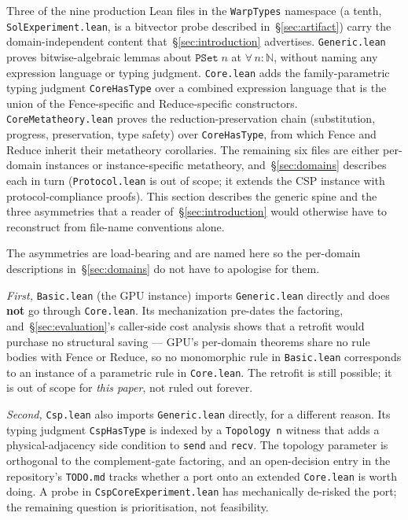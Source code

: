 \documentclass[acmsmall,screen,review,anonymous,nonacm]{acmart}
\newcommand{\PSet}{\texttt{PSet}}
\newcommand{\CoreHasType}{\texttt{CoreHasType}}
\begin{document}
Three of the nine production Lean files in the \texttt{WarpTypes} namespace (a tenth, \texttt{SolExperiment.lean}, is a bitvector probe described in~\S\ref{sec:artifact}) carry the domain-independent content that~\S\ref{sec:introduction} advertises. \texttt{Generic.lean} proves bitwise-algebraic lemmas about $\PSet\;n$ at $\forall\,n : \mathbb{N}$, without naming any expression language or typing judgment. \texttt{Core.lean} adds the family-parametric typing judgment \CoreHasType{} over a combined expression language that is the union of the Fence-specific and Reduce-specific constructors. \texttt{CoreMetatheory.lean} proves the reduction-preservation chain (substitution, progress, preservation, type safety) over \CoreHasType{}, from which Fence and Reduce inherit their metatheory corollaries. The remaining six files are either per-domain instances or instance-specific metatheory, and~\S\ref{sec:domains} describes each in turn (\texttt{Protocol.lean} is out of scope; it extends the CSP instance with protocol-compliance proofs). This section describes the generic spine and the three asymmetries that a reader of~\S\ref{sec:introduction} would otherwise have to reconstruct from file-name conventions alone.

The asymmetries are load-bearing and are named here so the per-domain descriptions in~\S\ref{sec:domains} do not have to apologise for them.

\emph{First,} \texttt{Basic.lean} (the GPU instance) imports \texttt{Generic.lean} directly and does \textbf{not} go through \texttt{Core.lean}. Its mechanization pre-dates the factoring, and~\S\ref{sec:evaluation}'s caller-side cost analysis shows that a retrofit would purchase no structural saving --- GPU's per-domain theorems share no rule bodies with Fence or Reduce, so no monomorphic rule in \texttt{Basic.lean} corresponds to an instance of a parametric rule in \texttt{Core.lean}. The retrofit is still possible; it is out of scope for \emph{this paper}, not ruled out forever.

\emph{Second,} \texttt{Csp.lean} also imports \texttt{Generic.lean} directly, for a different reason. Its typing judgment \texttt{CspHasType} is indexed by a \texttt{Topology n} witness that adds a physical-adjacency side condition to \texttt{send} and \texttt{recv}. The topology parameter is orthogonal to the complement-gate factoring, and an open-decision entry in the repository's \texttt{TODO.md} tracks whether a port onto an extended \texttt{Core.lean} is worth doing. A probe in \texttt{CspCoreExperiment.lean} has mechanically de-risked the port; the remaining question is prioritisation, not feasibility.
\end{document}
